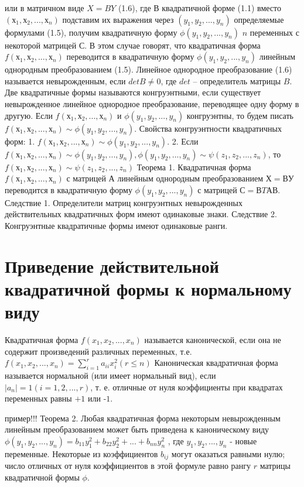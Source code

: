 \documentclass[a4paper,14pt]{report}
\newcommand\tab[1][1cm]{\hspace*{#1}}
\newcommand{\udsum}[3]{\sum\limits_{#1}^{#2}{#3}}
\newcommand{\tl}{\newline\tab}
\begin{document}
или в матричном виде $X=BY$ (1.6), где 
\tl
В квадратичной форме (1.1) вместо $(х_1, х_2,...,х_n)$ подставим их выражения через $(y_1, y_2,...,y_n)$ определяемые формулами (1.5), получим квадратичную форму $\phi (y_1, y_2,...,y_n)$ $n$ переменных с некоторой матрицей $С$. В этом случае говорят, что квадратичная форма $f(х_1, х_2,...,х_n)$ переводится в квадратичную форму $\phi(y_1, y_2,...,y_n)$ линейным однородным преобразованием (1.5). Линейное однородное преобразование (1.6) называется невырожденным, если $det B \ne 0$, где $det$ – определитель матрицы $B$.
\tl
Две квадратичные формы называются конгруэнтными, если существует невырожденное линейное однородное преобразование, переводящее одну форму в другую. Если $f(х_1, х_2,...,х_n)$ и $\phi(y_1, y_2,...,y_n)$ конгруэнтны, то будем писать $f(х_1, х_2,...,х_n) \sim \phi(y_1, y_2,...,y_n)$. Свойства конгруэнтности квадратичных форм:
\tl
1.  $f(х_1, х_2,...,х_n) \sim \phi(y_1, y_2,...,y_n)$.
\tl
2. Если $f(х_1, х_2,...,х_n) \sim \phi(y_1, y_2,...,y_n), \phi(y_1, y_2,...,y_n) \sim \psi(z_1,z_2,...,z_n)$, то $f(х_1, х_2,...,х_n) \sim \psi(z_1,z_2,...,z_n)$
\tl
Теорема 1. Квадратичная форма $f(х_1, х_2,...,х_n)$ с матрицей $А$ линейным однородным преобразованием $Х = ВУ$ переводится в квадратичную форму $\phi(y_1, y_2,...,y_n)$ с матрицей $С=ВT АВ$.
\tl
Следствие 1. Определители матриц конгруэнтных невырожденных действительных квадратичных форм имеют одинаковые знаки.
\tl
Следствие 2. Конгруэнтные квадратичные формы имеют одинаковые ранги.

\section{Приведение действительной квадратичной формы к нормальному виду}
\tab Квадратичная форма $f(x_1,x_2,...,x_n)$ называется канонической, если она не содержит произведений различных переменных, т.е.\newline $f(x_1,x_2,...,x_n)=\udsum{i=1}{r}{a_{ii}x_i^2} (r \le n)$
\tl
Каноническая квадратичная форма называется нормальной (или имеет нормальный вид), если $|a_n| = 1 ( i= 1, 2, . . . , r)$, т. е. отличные от нуля коэффициенты при квадратах переменных равны $+1$ или -$1$. 

пример!!!
\tl
Теорема 2. Любая квадратичная форма некоторым невырожденным линейным преобразованием может быть приведена к каноническому виду \newline $\phi(y_1,y_2,...,y_n)=b_{11}y_1^2+b_{22}y_2^2+...+b_{nn}y_n^2$ , где $y_1,y_2,...,y_n$ - новые переменные.
\tl
Некоторые из коэффициентов $b_{ij}$ могут оказаться равными нулю; число отличных от нуля коэффициентов в этой формуле равно рангу $r$ матрицы квадратичной формы $\phi$. 
\end{document}
